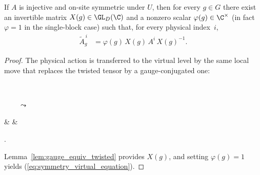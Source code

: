 \begin{lemma}\label{thm:virtual_symmetry_eq}
    \leanok
    If $A$ is injective and on-site symmetric under $U$, then
    for every $g \in G$ there exist an invertible matrix
    $X(g) \in \GL_{D}(\C)$ and a nonzero scalar
    $\varphi(g) \in \C^{\times}$ (in fact $\varphi=1$
    in the single-block case) such that, for every physical index~$i$,
    \begin{align}
        \widetilde{A}_g^{\,i}
         & =\varphi(g)\,X(g)\,A^i\,X(g)^{-1}.
        \label{eq:symmetry_virtual_equation}
    \end{align}
\end{lemma}

\begin{proof}\leanok{}
    The physical action is transferred to the virtual level by the same
    local move that replaces the twisted tensor by a gauge-conjugated one:
    \begin{tenkzequation}
        \tenkzkernel
        \begin{tenkz}[rows={op,ket}, cols=1, west=none, east=none]
             \\
        \end{tenkz}
        \(\qquad \leadsto \qquad\)
        \begin{tenkz}[rows={wire}, cols=3, west=open, east=open]
             &  &
        \end{tenkz}.
    \end{tenkzequation}
    Lemma~\ref{lem:gauge_equiv_twisted} provides $X(g)$, and setting
    $\varphi(g)=1$ yields (\ref{eq:symmetry_virtual_equation}).
\end{proof}

